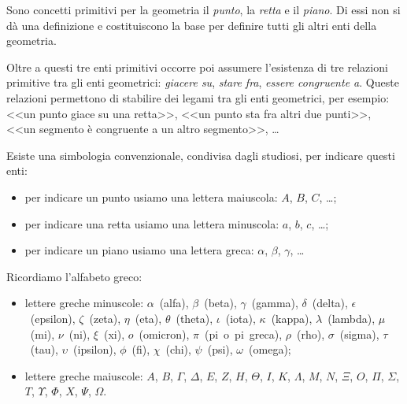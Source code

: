 Sono concetti primitivi per la geometria il \emph{punto}, la 
\emph{retta} e il \emph{piano}. Di essi non si dà una definizione e 
costituiscono la base per definire tutti gli altri enti della 
geometria.

Oltre a questi tre enti primitivi occorre poi assumere l'esistenza di 
tre relazioni primitive tra gli enti geometrici: \emph{giacere su}, 
\emph{stare fra}, \emph{essere congruente a}. Queste relazioni 
permettono di stabilire dei legami tra gli enti geometrici, per 
esempio: <<un punto giace su una retta>>, <<un punto sta fra altri 
due punti>>, <<un segmento è congruente a un altro segmento>>, \ldots

Esiste una simbologia convenzionale, condivisa dagli studiosi, per 
indicare questi enti:
\begin{itemize}
\item per indicare un punto usiamo una lettera maiuscola: \(A\), \(B\), 
\(C\), \ldots;
\item per indicare una retta usiamo una lettera minuscola: \(a\), \(b\), 
\(c\), \ldots;
\item per indicare un piano usiamo una lettera greca: \(\alpha\), 
\(\beta\), \(\gamma\), \ldots
\end{itemize}

Ricordiamo l'alfabeto greco:
\begin{itemize}
\item lettere greche minuscole:  \(\alpha\)~(alfa),  \(\beta\)~(beta),  
\(\gamma\)~(gamma),  \(\delta\)~(delta), \(\epsilon\)~(epsilon), 
\(\zeta\)~(zeta), \(\eta\)~(eta), \(\theta\)~(theta),  \(\iota\)~(iota),  
\(\kappa\)~(kappa), \(\lambda\)~(lambda), \(\mu\)~(mi), \(\nu\)~(ni),  
\(\xi\)~(xi), \(o\)~(omicron), \(\pi\)~(pi~o~pi~greca), \(\rho\)~(rho), 
\(\sigma\)~(sigma), \(\tau\)~(tau), \(\upsilon\)~(ipsilon), \(\phi\)~(fi), 
\(\chi\)~(chi), \(\psi\)~(psi), \(\omega\)~(omega);
\item lettere greche maiuscole: \(A\), \(B\), \( \Gamma \), \( \Delta \), \( E 
\), \( Z \), \( H \), \( \Theta \), \( I \), \( K \), \( \Lambda \), \( M \), \( N \), 
\( \Xi \), \( O \), \( \Pi \), \( \Sigma \), \( T \), \( \Upsilon \), \( \Phi \), \( 
X \), \( \Psi \), \(\Omega \).
\end{itemize}

